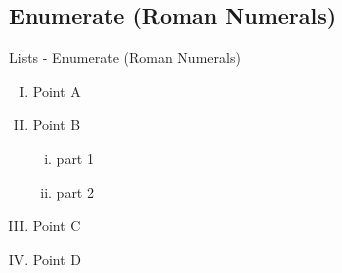 \subsection{Enumerate (Roman Numerals)}
\label{enumerateRomanNumerals}
\begin{frame}{Lists - Enumerate (Roman Numerals)}
  \begin{enumerate} [(I)]
	\item Point A
	\item Point B
	\begin{enumerate} [(i)]
	  \item part 1
      \item part 2
	\end{enumerate}
	\item Point C
	\item Point D
  \end{enumerate}
\end{frame}
